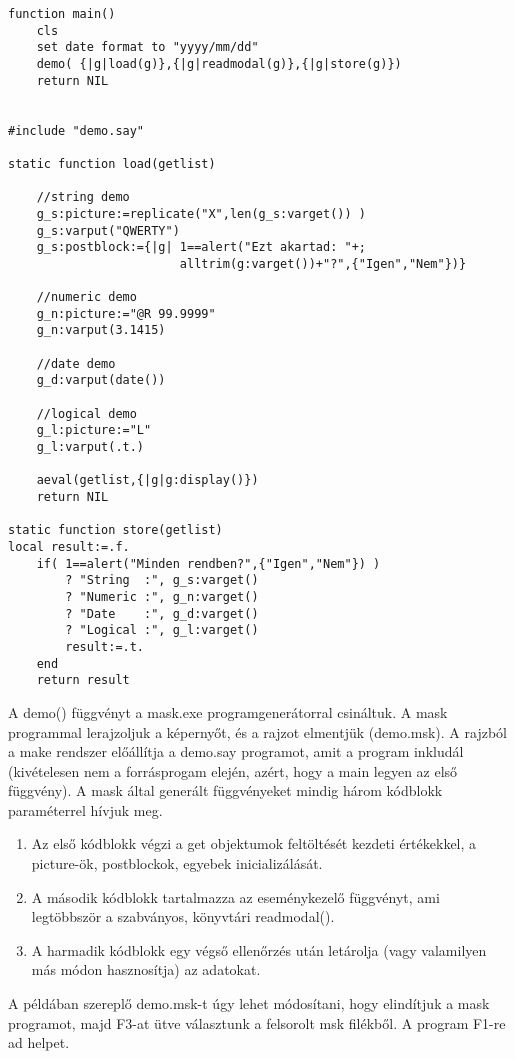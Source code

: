 \begin{verbatim}
function main()
    cls
    set date format to "yyyy/mm/dd"
    demo( {|g|load(g)},{|g|readmodal(g)},{|g|store(g)})
    return NIL
     

#include "demo.say"

static function load(getlist)     

    //string demo
    g_s:picture:=replicate("X",len(g_s:varget()) )
    g_s:varput("QWERTY")
    g_s:postblock:={|g| 1==alert("Ezt akartad: "+;
                        alltrim(g:varget())+"?",{"Igen","Nem"})}

    //numeric demo
    g_n:picture:="@R 99.9999"
    g_n:varput(3.1415)

    //date demo
    g_d:varput(date())

    //logical demo
    g_l:picture:="L"
    g_l:varput(.t.)

    aeval(getlist,{|g|g:display()})                          
    return NIL
    
static function store(getlist)    
local result:=.f.
    if( 1==alert("Minden rendben?",{"Igen","Nem"}) )
        ? "String  :", g_s:varget()
        ? "Numeric :", g_n:varget()
        ? "Date    :", g_d:varget()
        ? "Logical :", g_l:varget()
        result:=.t.
    end
    return result

\end{verbatim}

A demo() függvényt a mask.exe programgenerátorral csináltuk.
A mask programmal lerajzoljuk a képernyőt, és a rajzot elmentjük
(demo.msk). A rajzból a make rendszer előállítja a demo.say
programot, amit a program inkludál (kivételesen nem a forrásprogam
elején, azért, hogy a main legyen az első függvény). A mask által 
generált függvényeket mindig három kódblokk paraméterrel hívjuk meg.

\begin{enumerate}
\item Az első kódblokk végzi a get objektumok feltöltését 
      kezdeti értékekkel, a picture-ök, postblockok, egyebek
      inicializálását.
\item A második kódblokk tartalmazza az eseménykezelő függvényt,
      ami legtöbbször a szabványos, könyvtári readmodal().
\item A harmadik kódblokk egy végső ellenőrzés után letárolja
      (vagy valamilyen más módon hasznosítja) az adatokat.
\end{enumerate}

A példában szereplő demo.msk-t úgy lehet módosítani, hogy elindítjuk
a mask programot, majd F3-at ütve választunk a felsorolt msk filékből.
A program F1-re ad helpet.

